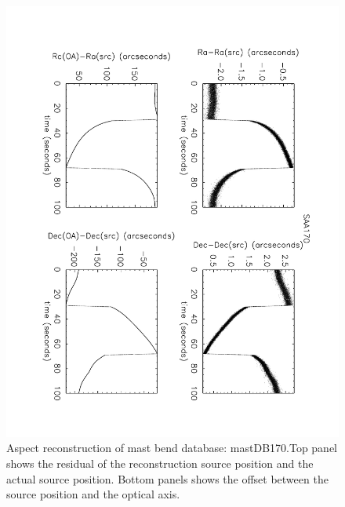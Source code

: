 \begin{figure}[htbp] %
   \centering
   \includegraphics[width=14cm, angle=180]{images/test4.pdf} 
   \caption{\footnotesize{Aspect reconstruction of mast bend database: mastDB170.Top panel shows the residual of the reconstruction source position and the actual source position. Bottom panels shows the offset between the source position and the optical axis.}}
   \label{test4}
\end{figure}
